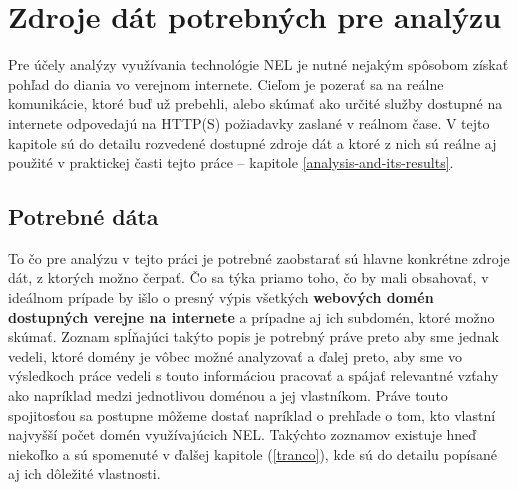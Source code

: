 \chapter{Zdroje dát potrebných pre analýzu}
\label{data-sources-available-for-research}



Pre účely analýzy využívania technológie NEL je nutné nejakým spôsobom získať pohľad do diania vo verejnom internete.
Cieľom je pozerať sa na reálne komunikácie, ktoré buď už prebehli, alebo skúmať ako určité služby dostupné na internete
odpovedajú na HTTP(S) požiadavky zaslané v reálnom čase. V tejto kapitole sú do detailu rozvedené dostupné zdroje dát 
a ktoré z nich sú reálne aj použité v praktickej časti tejto práce -- kapitole \ref{analysis-and-its-results}.

\section{Potrebné dáta}

To čo pre analýzu v tejto práci je potrebné zaobstarať sú hlavne konkrétne zdroje dát, z ktorých možno čerpať. Čo sa týka priamo toho,
čo by mali obsahovať, v ideálnom prípade by išlo o presný výpis všetkých \textbf{webových domén dostupných verejne na internete} a prípadne aj ich subdomén, ktoré možno skúmať. 
Zoznam spĺňajúci takýto popis je potrebný práve preto aby sme jednak vedeli, ktoré domény je vôbec možné analyzovať a ďalej preto, aby sme vo výsledkoch práce vedeli s touto informáciou pracovať a spájať relevantné vzťahy ako napríklad medzi jednotlivou doménou a jej vlastníkom. 
Práve touto spojitosťou sa postupne môžeme dostať napríklad o prehľade o tom, kto vlastní najvyšší počet domén využívajúcich NEL. 
Takýchto zoznamov existuje hneď niekoľko a sú spomenuté v ďalšej kapitole (\ref{tranco}), kde sú do detailu popísané aj ich dôležité vlastnosti.

